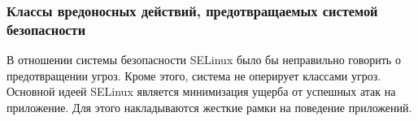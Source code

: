 \subsubsection{Классы вредоносных действий, предотвращаемых 
	системой безопасности} 

В отношении системы безопасности SELinux было бы неправильно 
говорить о предотвращении угроз. Кроме этого, система не 
оперирует классами угроз. Основной идеей SELinux является 
минимизация ущерба от успешных атак на приложение. Для 
этого накладываются жесткие рамки на поведение приложений. 


\begin{comment}
\subsubsection{Принципы работы}

Главными элементами системы безопасности 
являются субъект, объект и действия. В классы 
объектов входят классы файлов (blk\_file, chr\_
file, dir, fd,...\ ) ,  классы межпрограммного 
взаимодействия (ipc,msg,msgq,sem,shm), классы 
сетевого взаимодействия (key\_socket,netif,node,
packet\_socket,tcp\_socket), классы объектов 
(passwd), системные классы (capability, process,
Secutity, System). Под субъектами понимаются 
процессы, демоны, ядро и.т.д.. Действия, которые субъекты 
SELinux могут производить над объектами 
различны для различных классов объектов. 
Для классов файлов это, например, 
будут создание, исполнение, ссылки, чтение, запись, 
удаление. 

SELinux ассоциирует атрибуты безопасности 
с субъектами и объектами и основывает свои решения 
на этих атрибутах. Атрибутами являются: идентификатор 
пользователя, роль и тип. Идентификатор пользователя 
— пользовательская учетная запись, ассоциированная с 
субъектом или объектом. У каждого пользователя может 
быть несколько ролей, но в какой-то конкретный момент
времени ему может быть предписана только одна из них. 
Пользователь может менять роли командой newrole. Типы 
(для процессов~--- Домены) делят субъекты и объекты на родственные 
группы. Это~--— главный атрибут безопасности, используемый 
SELinux для принятия решений. 

Типы позволяют помещать 
процессы в "песочницы" и предотвращать повышение 
привилегий. К примеру, роль суперпользователя - 
sysadm\_r, его тип — sysadm\_t. Политика безопасности 
SELinux загружается системой из бинарного файла политики,
который, как правило, находится в /etc/selinux. 
Бинарная политика собирается при помощи make, исходные 
коды, как правило, находятся в /etc/selinux/\$(POLNAME)/src/policy.


\end{comment}
